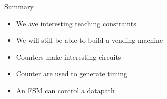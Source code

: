 \begin{frame}[fragile]{Summary}
\begin{itemize}
\item We ave interesting teaching constraints
\item We will still be able to build a vending machine
\item Counters make interesting circuits
\item Counter are used to generate timing
\item An FSM can control a datapath
\end{itemize}
\end{frame}




